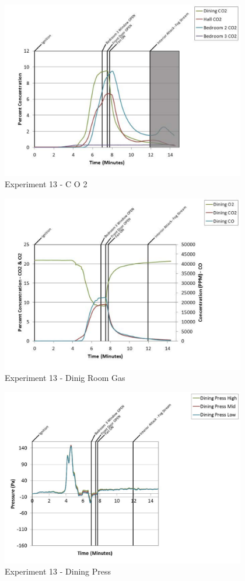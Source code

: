 \documentclass{article}
\begin{document}
\begin{appendices}
	\begin{figure}[h!]
		\centering
		\includegraphics[height=3.05in]{0_Images/Results_Charts/Exp_13_Charts/CO2.pdf}
		\caption{Experiment 13 - C O 2}
	\end{figure}
 
	\clearpage

	\begin{figure}[h!]
		\centering
		\includegraphics[height=3.05in]{0_Images/Results_Charts/Exp_13_Charts/DinigRoomGas.pdf}
		\caption{Experiment 13 - Dinig Room Gas}
	\end{figure}
 

	\begin{figure}[h!]
		\centering
		\includegraphics[height=3.05in]{0_Images/Results_Charts/Exp_13_Charts/DiningPress.pdf}
		\caption{Experiment 13 - Dining Press}
	\end{figure}
 

\end{appendices}
\end{document}
